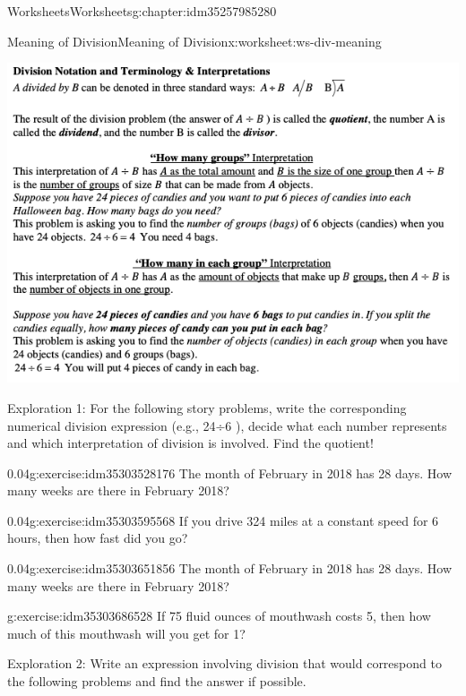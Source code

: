 \documentclass[twoside,11pt,]{book}
\begin{document}
\begin{chapterptx}{Worksheets}{}{Worksheets}{}{}{g:chapter:idm35257985280}
\begin{worksheet-section-numberless}{Meaning of Division}{}{Meaning of Division}{}{}{x:worksheet:ws-div-meaning}
\begin{introduction}{}
\begin{sidebyside}{1}{0}{0}{0}
\begin{sbspanel}{1}
\includegraphics[width=1\linewidth]{images/div-meaning.png}
\end{sbspanel}%
\end{sidebyside}%
%
\par
Exploration 1: For the following story problems, write the corresponding numerical division expression (e.g.,  24÷6 ), decide what each number represents and which interpretation of division is involved. Find the quotient!%
\end{introduction}%
\begin{divisionexercise}{1}{}{0.04}{g:exercise:idm35303528176}%
The month of February in 2018 has 28 days. How many weeks are there in February 2018?%
\end{divisionexercise}%
\begin{divisionexercise}{2}{}{0.04}{g:exercise:idm35303595568}%
If you drive 324 miles at a constant speed for 6 hours, then how fast did you go?%
\end{divisionexercise}%
\begin{divisionexercise}{3}{}{0.04}{g:exercise:idm35303651856}%
The month of February in 2018 has 28 days. How many weeks are there in February 2018?%
\end{divisionexercise}%
\begin{divisionexercise}{4}{}{}{g:exercise:idm35303686528}%
If 75 fluid ounces of mouthwash costs \textdollar{}5, then how much of this mouthwash will you get for \textdollar{}1?%
\end{divisionexercise}%
\clearpage
\begin{introduction}{}%
Exploration 2: Write an expression involving division that would correspond to the following problems and find the answer if possible.%

\end{introduction}
\end{worksheet-section-numberless}
\end{chapterptx}
\end{document}
